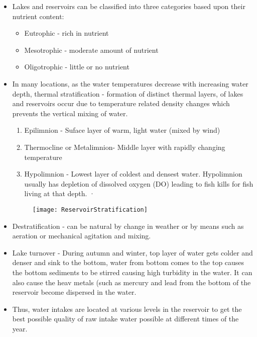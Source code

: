 \begin{itemize}
\item Lakes and reservoirs can be classified into three categories  based upon their nutrient content:
\begin{itemize}  
\item Eutrophic - rich in nutrient
\item Mesotrophic - moderate amount of nutrient 
\item Oligotrophic - little or no nutrient
\end{itemize}
\item In many locations, as the water temperatures decrease with increasing water depth, thermal stratification  - formation of distinct thermal layers, of lakes and reservoirs occur due to temperature related density changes which prevents the vertical mixing of water. 
\begin{enumerate}   
\item Epilimnion - Suface layer of warm, light water (mixed by wind)
\item Thermocline or Metalimnion- Middle layer with rapidly changing temperature
\item Hypolimnion - Lowest layer of coldest and densest water. Hypolimnion usually has depletion of dissolved oxygen (DO) leading to fish kills for fish living at that depth.	·
\end{enumerate}

\begin{figure}
\begin{center}
\texttt{[image: ReservoirStratification]}\\
\label{Lake/reservoir stratification}
\end{center}
\end{figure}
\item Destratification  - can be natural by change in weather or by means such as aeration or mechanical agitation and mixing.
\item Lake turnover - During autumn and winter, top layer of water gets colder and denser and
sink to the bottom, water from bottom comes to the top causes the bottom sediments to be stirred	causing high turbidity in the water. It can also cause the heav metals (such as mercury and lead from the bottom of the reservoir become dispersed in the water.

\item Thus, water intakes are located at various levels in the reservoir to get the best possible quality of raw intake water possible at different times of the year.

\end{itemize}

